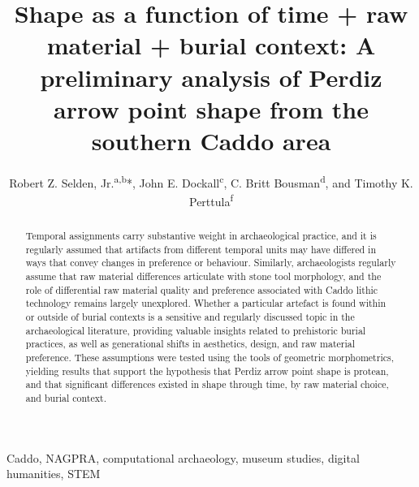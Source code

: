 \documentclass[review]{elsarticle}
\begin{document}
\begin{frontmatter}

\title{Shape as a function of time + raw material + burial context: A preliminary analysis of Perdiz arrow point shape from the southern Caddo area}

\author{Robert Z. Selden, Jr.\textsuperscript{a,b}*, John E. Dockall\textsuperscript{c}, C. Britt Bousman\textsuperscript{d}, and Timothy K. Perttula\textsuperscript{f}}
\address[1]{Heritage Research Center, Stephen F. Austin State University, USA}
\address[2]{Cultural Heritage Department, Jean Monnet University, FR}
\address[3]{Cox|McClain Environmental Consulting, Inc., USA}
\address[4]{Department of Anthropology, Texas State University, USA}
\address[5]{Archeological \& Environmental Consultants, LLC, USA}

\begin{abstract}
Temporal assignments carry substantive weight in archaeological practice, and it is regularly assumed that artifacts from different temporal units may have differed in ways that convey changes in preference or behaviour. Similarly, archaeologists regularly assume that raw material differences articulate with stone tool morphology, and the role of differential raw material quality and preference associated with Caddo lithic technology remains largely unexplored. Whether a particular artefact is found within or outside of burial contexts is a sensitive and regularly discussed topic in the archaeological literature, providing valuable insights related to prehistoric burial practices, as well as generational shifts in aesthetics, design, and raw material preference. These assumptions were tested using the tools of geometric morphometrics, yielding results that support the hypothesis that Perdiz arrow point shape is protean, and that significant differences existed in shape through time, by raw material choice, and burial context.
\end{abstract}

\begin{keyword}
Caddo, NAGPRA, computational archaeology, museum studies, digital humanities, STEM
\end{keyword}

\end{frontmatter}

\linenumbers

\newpage
\section*{}
\end{document}
